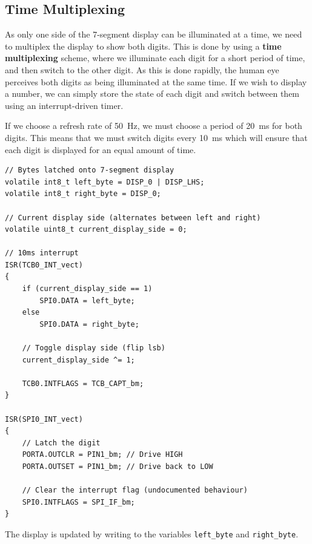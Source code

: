 \documentclass{report}
\begin{document}
\subsection{Time Multiplexing}
As only one side of the 7-segment display can be illuminated at a time, we need to multiplex the display to show both digits.
This is done by using a \textbf{time multiplexing} scheme, where we illuminate each digit for a short period of time, and then switch to the other digit.
As this is done rapidly, the human eye perceives both digits as being illuminated at the same time. If we wish to display a number, we can simply
store the state of each digit and switch between them using an interrupt-driven timer.

If we choose a refresh rate of \qty{50}{Hz}, we must choose a period of \qty{20}{ms} for both digits. This means that we must switch digits every \qty{10}{ms}
which will ensure that each digit is displayed for an equal amount of time.
\begin{verbatim}
// Bytes latched onto 7-segment display
volatile int8_t left_byte = DISP_0 | DISP_LHS;
volatile int8_t right_byte = DISP_0;

// Current display side (alternates between left and right)
volatile uint8_t current_display_side = 0;

// 10ms interrupt
ISR(TCB0_INT_vect)
{
    if (current_display_side == 1)
        SPI0.DATA = left_byte;
    else
        SPI0.DATA = right_byte;

    // Toggle display side (flip lsb)
    current_display_side ^= 1;

    TCB0.INTFLAGS = TCB_CAPT_bm;
}

ISR(SPI0_INT_vect)
{
    // Latch the digit
    PORTA.OUTCLR = PIN1_bm; // Drive HIGH
    PORTA.OUTSET = PIN1_bm; // Drive back to LOW

    // Clear the interrupt flag (undocumented behaviour)
    SPI0.INTFLAGS = SPI_IF_bm;
}
\end{verbatim}
The display is updated by writing to the variables \texttt{left_byte} and \texttt{right_byte}.
\end{document}
